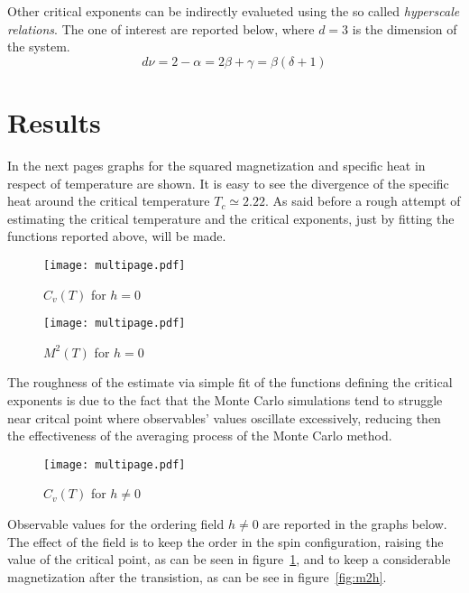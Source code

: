 Other critical exponents can be indirectly evalueted using the so called 
\emph{hyperscale relations}. The one of interest are reported below, where $d=3$ 
is the dimension of the system.
\begin{equation}
\label{eq:hyper}
d \nu = 2 - \alpha = 2 \beta + \gamma = \beta(\delta + 1) 
\end{equation}


\section{Results}

In the next pages graphs for the squared magnetization and specific heat in respect of
temperature are shown. It is easy to see the divergence of the specific heat around 
the critical temperature $T_c \simeq 2.22$. As said before a rough attempt 
of estimating the critical temperature and the critical exponents, just by
fitting the functions reported above, will be made.

\begin{figure}[H]
\centering
\texttt{[image: multipage.pdf]}
\caption{$C_v (T)$ for $h=0$}
\end{figure}

\begin{figure}[H]                                   
\centering                                       
\texttt{[image: multipage.pdf]}
\caption{$M^2 (T)$ for $h=0$}                    
\end{figure}                                     

The roughness of the estimate via simple fit of the functions defining the critical
exponents is due to the fact that the Monte Carlo simulations tend to struggle near critcal
point where observables' values oscillate excessively, reducing then the effectiveness
of the averaging process of the Monte Carlo method. 

\begin{figure}[H]
\centering                                       
\texttt{[image: multipage.pdf]}
\caption{$C_v (T)$ for $h \neq 0$}                    
\label{fig:cvh}
\end{figure}                                     

Observable values for the ordering field $h\neq 0$ are reported in the graphs below. 
The effect of the field is to keep the order in the spin configuration, raising the
value of the critical point, as can be seen in figure~\ref{fig:cvh}, and to keep
a considerable magnetization after the transistion, as can be see in 
figure~\ref{fig:m2h}.

